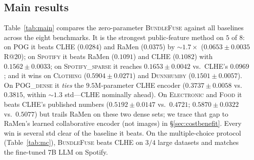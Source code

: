 \subsection{Main results}
\label{sec:results}
Table~\ref{tab:main} compares the zero-parameter \textsc{BundleFuse} against all baselines across the eight
benchmarks. It is the strongest public-feature method on $5$ of $8$: on \textsc{POG} it beats CLHE ($0.0284$) and
RaMen ($0.0375$) by ${\sim}1.7\times$ ($0.0653 \pm 0.0035$ R@20); on \textsc{Spotify} it beats RaMen ($0.1091$) and
CLHE ($0.1082$) with $0.1562 \pm 0.0033$; on \textsc{Spotify\_sparse} it reaches $0.1653 \pm 0.0042$ vs.\ CLHE's
$0.0969$; and it wins on \textsc{Clothing} ($0.5904 \pm 0.0271$) and \textsc{Dunnhumby} ($0.1501 \pm 0.0057$). On
\textsc{POG\_dense} it \emph{ties} the $9.5$M-parameter CLHE encoder ($0.3737 \pm 0.0058$ vs.\ $0.3815$, within
${\sim}1.3$ std---CLHE nominally ahead). On \textsc{Electronic} and \textsc{Food} it beats CLHE's published numbers
($0.5192 \pm 0.0147$ vs.\ $0.4721$; $0.5870 \pm 0.0322$ vs.\ $0.5077$) but trails RaMen on these two dense sets; we
trace that gap to RaMen's learned collaborative encoder (not images) in \S\ref{sec:costbenefit}. Every win is several std clear of the baseline it beats. On the multiple-choice
protocol (Table~\ref{tab:mc}), \textsc{BundleFuse} beats CLHE on $3/4$ large datasets and matches the fine-tuned 7B
LLM on Spotify.

